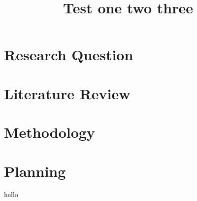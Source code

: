 \documentclass[12pt]{report}
\title{Test one two three}
\begin{document}
\maketitle
\chapter{Research Question}
\chapter{Literature Review}
\chapter{Methodology}
\chapter{Planning}

hello
\end{document}
